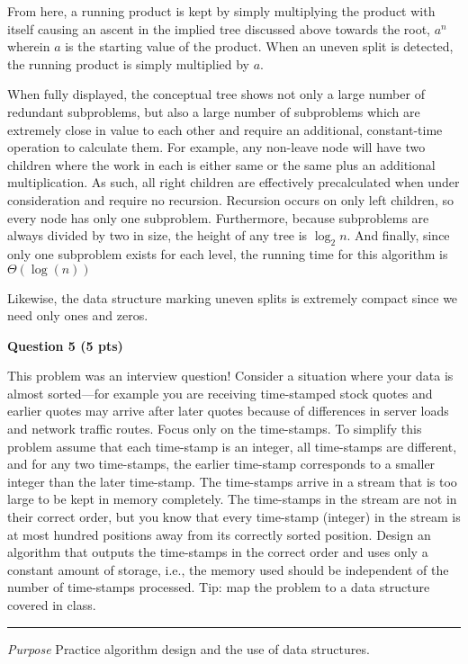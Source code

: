 \documentclass{article}
\begin{document}
From here, a running product is kept by simply multiplying the product with
itself causing an ascent in the implied tree discussed above towards the root,
$a^n$ wherein $a$ is the starting value of the product. When an uneven split is
detected, the running product is simply multiplied by $a$.

When fully displayed, the conceptual tree shows not only a large number of 
redundant subproblems, but also a large number of subproblems which are extremely
close in value to each other and require an additional, constant-time operation
to calculate them. For example, any non-leave node will have two children where
the work in each is either same or the same plus an additional multiplication. As
such, all right children are effectively precalculated when under consideration 
and require no recursion. Recursion occurs on only left children, so every node
has only one subproblem. Furthermore, because subproblems are always divided by
two in size, the height of any tree is $\log_{2}n$. And finally, since only one
subproblem exists for each level, the running time for this algorithm is 
$\Theta(\log(n))$

Likewise, the data structure marking uneven splits is extremely compact since we
need only ones and zeros.
\newpage



\begin{framed}
    \textbf{Question 5 (5 pts)} 
    
    This problem was an interview question! Consider a situation where your 
    data is almost sorted—for example you are receiving time-stamped stock
    quotes and earlier quotes may arrive after later quotes because of 
    differences in server loads and network traffic routes. Focus only on the
    time-stamps. To simplify this problem assume that each time-stamp is an
    integer, all time-stamps are different, and for any two time-stamps, the
    earlier time-stamp corresponds to a smaller integer than the later
    time-stamp. The time-stamps arrive in a stream that is too large to be 
    kept in memory completely. The time-stamps in the stream are not in their
    correct order, but you know that every time-stamp (integer) in the stream
    is at most hundred positions away from its correctly sorted position. 
    Design an algorithm that outputs the time-stamps in the correct order and
    uses only a constant amount of storage, i.e., the memory used should be
    independent of the number of time-stamps processed. Tip: map the problem 
    to a data structure covered in class.
    
    \rule{\textwidth}{.2pt}
    
    \textit{Purpose} Practice algorithm design and the use of data structures.
\end{framed}
\end{document}

